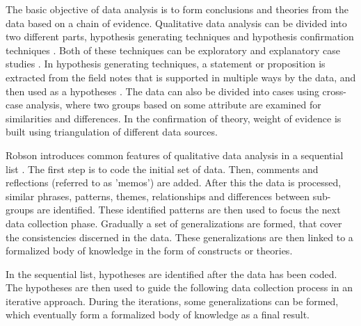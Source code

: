 \documentclass[english]{tktltiki2}
\theoremstyle{definition}
\theoremstyle{remark}
\begin{document}
The basic objective of data analysis is to form conclusions and theories from the data based on a chain of evidence. Qualitative data analysis can be divided into two different parts, hypothesis generating techniques and hypothesis confirmation techniques \cite{runeson2009guidelines}. Both of these techniques can be exploratory and explanatory case studies \cite{runeson2009guidelines}. In hypothesis generating techniques, a statement or proposition is extracted from the field notes that is supported in multiple ways by the data, and then used as a hypotheses \cite{seaman1999qualitative}. The data can also be divided into cases using cross-case analysis, where two groups based on some attribute are examined for similarities and differences. In the confirmation of theory, weight of evidence is built using triangulation of different data sources. 

Robson introduces common features of qualitative data analysis in a sequential list \cite{robson2002real}. The first step is to code the initial set of data. Then, comments and reflections (referred to as 'memos') are added. After this the data is processed, similar phrases, patterns, themes, relationships and differences between sub-groups are identified. These identified patterns are then used to focus the next data collection phase. Gradually a set of generalizations are formed, that cover the consistencies discerned in the data. These generalizations are then linked to a formalized body of knowledge in the form of constructs or theories. 

In the sequential list, hypotheses are identified after the data has been coded. The hypotheses are then used to guide the following data collection process in an iterative approach. During the iterations, some generalizations can be formed, which eventually form a formalized body of knowledge as a final result.
\end{document}
